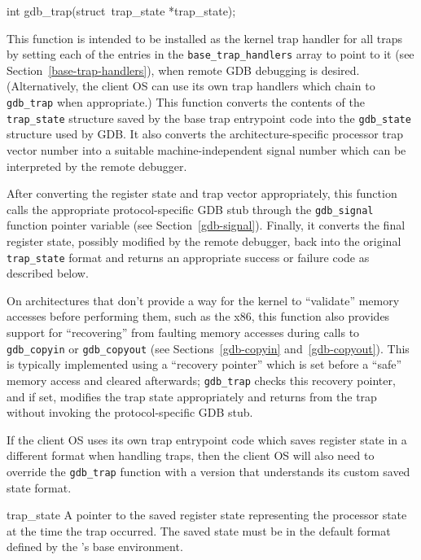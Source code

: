 \label{gdb-trap}
\begin{apisyn}

	\funcproto int gdb_trap(struct~trap_state *trap_state);
\end{apisyn}
\begin{apidesc}
	This function is intended to be installed
	as the kernel trap handler for all traps by setting each of the
	entries in the {\tt base_trap_handlers} array to point to it
	(see Section~\ref{base-trap-handlers}),
	when remote GDB debugging is desired.
	(Alternatively, the client OS can use its own trap handlers
	which chain to {\tt gdb_trap} when appropriate.)
	This function converts the contents of the {\tt trap_state} structure
	saved by the base trap entrypoint code
	into the {\tt gdb_state} structure used by GDB\@.
	It also converts the architecture-specific processor trap vector number
	into a suitable machine-independent signal number
	which can be interpreted by the remote debugger.

	After converting the register state and trap vector appropriately,
	this function calls the appropriate protocol-specific GDB stub
	through the {\tt gdb_signal} function pointer variable
	(see Section~\ref{gdb-signal}).
	Finally, it converts the final register state,
	possibly modified by the remote debugger,
	back into the original {\tt trap_state} format
	and returns an appropriate success or failure code
	as described below.

	On architectures that don't provide a way
	for the kernel to ``validate'' memory accesses before performing them,
	such as the x86,
	this function also provides support for ``recovering''
	from faulting memory accesses during calls
	to {\tt gdb_copyin} or {\tt gdb_copyout}
	(see Sections~\ref{gdb-copyin} and~\ref{gdb-copyout}).
	This is typically implemented using a ``recovery pointer''
	which is set before a ``safe'' memory access and cleared afterwards;
	{\tt gdb_trap} checks this recovery pointer, and if set,
	modifies the trap state appropriately and returns from the trap
	without invoking the protocol-specific GDB stub.

	If the client OS uses its own trap entrypoint code
	which saves register state in a different format
	when handling traps,
	then the client OS will also need
	to override the {\tt gdb_trap} function
	with a version that understands its custom saved state format.
\end{apidesc}
\begin{apiparm}
	\item[trap_state]
		A pointer to the saved register state
		representing the processor state at the time the trap occurred.
		The saved state must be in the default format
		defined by the \oskit{}'s base environment.
\end{apiparm}
